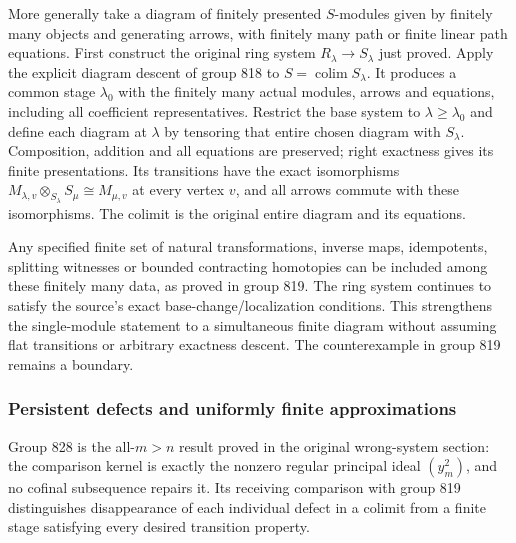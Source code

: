 More generally take a diagram of finitely presented \(S\)-modules given by finitely many objects and generating arrows, with finitely many path or finite linear path equations. First construct the original ring system \(R_\lambda\to S_\lambda\) just proved. Apply the explicit diagram descent of group 818 to \(S=\operatorname{colim}S_\lambda\). It produces a common stage \(\lambda_0\) with the finitely many actual modules, arrows and equations, including all coefficient representatives. Restrict the base system to \(\lambda\ge\lambda_0\) and define each diagram at \(\lambda\) by tensoring that entire chosen diagram with \(S_\lambda\). Composition, addition and all equations are preserved; right exactness gives its finite presentations. Its transitions have the exact isomorphisms \(M_{\lambda,v}\otimes_{S_\lambda}S_\mu\cong M_{\mu,v}\) at every vertex \(v\), and all arrows commute with these isomorphisms. The colimit is the original entire diagram and its equations.

Any specified finite set of natural transformations, inverse maps, idempotents, splitting witnesses or bounded contracting homotopies can be included among these finitely many data, as proved in group 819. The ring system continues to satisfy the source's exact base-change/localization conditions. This strengthens the single-module statement to a simultaneous finite diagram without assuming flat transitions or arbitrary exactness descent. The counterexample in group 819 remains a boundary.

\subsubsection{Persistent defects and uniformly finite approximations}\label{algebra-proof-037-persistent-defects-and-uniformly-finite-approximations}

Group 828 is the all-\(m>n\) result proved in the original wrong-system section: the comparison kernel is exactly the nonzero regular principal ideal \((y_m^2)\), and no cofinal subsequence repairs it. Its receiving comparison with group 819 distinguishes disappearance of each individual defect in a colimit from a finite stage satisfying every desired transition property.

